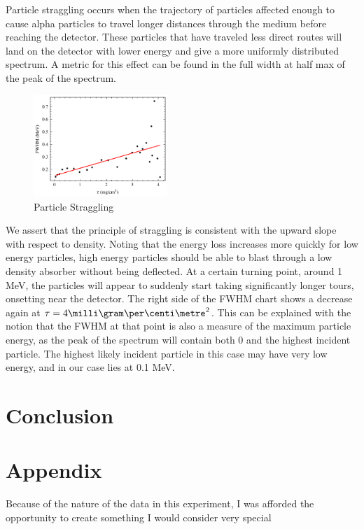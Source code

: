 \documentclass[12pt]{article}
\begin{document}
\begin{multicols}{2}
    Particle straggling occurs when the trajectory of particles affected enough to cause alpha particles to travel longer distances through the medium before reaching the detector. These particles that have traveled less direct routes will land on the detector with lower energy and give a more uniformly distributed spectrum. A metric for this effect can be found in the full width at half max of the peak of the spectrum. 
    
    \begin{figure}[H]
        \includegraphics[width=0.45\textwidth]{charts/FWHM.png}
        \caption{Particle Straggling}
        \label{fwhm}
    \end{figure}
    We assert that the principle of straggling is consistent with the upward slope with respect to density. Noting that the energy loss increases more quickly for low energy particles, high energy particles should be able to blast through a low density absorber without being deflected. At a certain turning point, around 1 MeV, the particles will appear to suddenly start taking significantly longer tours, onsetting near the detector. The right side of the FWHM chart shows a decrease again at $\tau = 4 \milli \gram \per \centi \metre^2$. This can be explained with the notion that the FWHM at that point is also a measure of the maximum particle energy, as the peak of the spectrum will contain both 0 and the highest incident particle. The highest likely incident particle in this case may have very low energy, and in our case lies at 0.1 MeV.

    \section{Conclusion}

    \section{Appendix}
    Because of the nature of the data in this experiment, I was afforded the opportunity to create something I would consider very special

    
    
\end{multicols}
\end{document}
